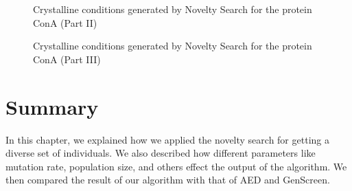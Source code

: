 \newpage
\begin{figure}[H]
	\caption{Crystalline conditions generated by Novelty Search for the protein ConA (Part II)}
	\label{fig:crystal2}
\end{figure}

\newpage
\begin{figure}[H]
	\caption{Crystalline conditions generated by Novelty Search for the protein ConA (Part III)}
	\label{fig:crystal3}
\end{figure}

\section{Summary} \label{rel:summary}

In this chapter, we explained how we applied the novelty search for getting a diverse set of individuals. We also described how different parameters like mutation rate, population size, and others effect the output of the algorithm. We then compared the result of our algorithm with that of AED and GenScreen.



    
